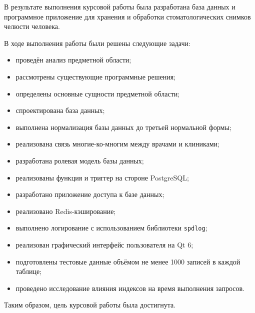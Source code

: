 
В результате выполнения курсовой работы была разработана база данных и программное приложение для хранения и обработки стоматологических снимков челюсти человека.

В ходе выполнения работы были решены следующие задачи:

\begin{itemize}
	\item проведён анализ предметной области;
	\item рассмотрены существующие программные решения;
	\item определены основные сущности предметной области;
	\item спроектирована база данных;
	\item выполнена нормализация базы данных до третьей нормальной формы;
	\item реализована связь многие-ко-многим между врачами и клиниками;
	\item разработана ролевая модель базы данных;
	\item реализованы функция и триггер на стороне PostgreSQL;
	\item разработано приложение доступа к базе данных;
	\item реализовано Redis-кэширование;
	\item выполнено логирование с использованием библиотеки \texttt{spdlog};
	\item реализован графический интерфейс пользователя на Qt 6;
	\item подготовлены тестовые данные объёмом не менее 1000 записей в каждой таблице;
	\item проведено исследование влияния индексов на время выполнения запросов.
\end{itemize}

Таким образом, цель курсовой работы была достигнута.

\clearpage